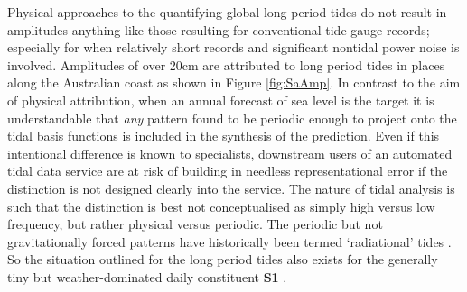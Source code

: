 Physical approaches to the quantifying global long period tides \citep{Egbert:1994wz} do not result in amplitudes anything like those resulting for conventional tide gauge records; especially for when relatively short records and significant nontidal power noise is involved.   Amplitudes of over 20cm are attributed to long period tides in places along the Australian coast as shown in Figure \ref{fig:SaAmp}. In contrast to the aim of physical attribution, when an annual forecast of sea level is the target it is understandable that \textit{any} pattern found to be periodic enough to project onto the tidal basis functions is included in the synthesis of the prediction. 
Even if this intentional difference is known to specialists, downstream users of an automated tidal data service are at risk of building in needless representational error if the distinction is not designed clearly into the service.
The nature of tidal analysis is such that the distinction is best not conceptualised as simply high versus low frequency, but rather physical versus periodic.   The periodic but not gravitationally forced patterns have historically been termed `radiational' tides \cite{10.1016/b978-0-444-53802-4.00058-0}.  So the situation outlined for the long period tides also exists for the generally tiny but weather-dominated daily constituent \textbf{S1} \cite{Ray:2004ts}.
 

